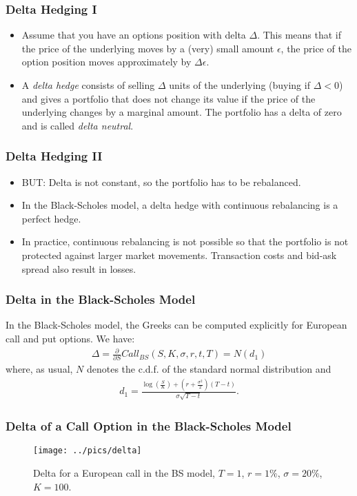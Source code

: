 \begin{frame}[fragile]
\frametitle{Delta Hedging I}
\begin{itemize}
  \item Assume that you have an options position with delta $\Delta$. This means
  that if the price of the underlying moves by a (very) small amount $\epsilon$, the
  price of the option position moves approximately by $\Delta \epsilon$.
  \item A \emph{delta hedge} consists of selling $\Delta$ units of the
  underlying (buying if $\Delta <0$) and gives a portfolio that does not
  change its value if the price of the underlying changes by a marginal amount.
  The portfolio has a delta of zero and is called \emph{delta neutral}.
\end{itemize}
\end{frame}

\begin{frame}[fragile]
\frametitle{Delta Hedging II}
\begin{itemize}
  \item BUT: Delta is not constant, so the portfolio has to be rebalanced.
  \item In the Black-Scholes model, a delta hedge with continuous rebalancing is
  a perfect hedge.
  \item In practice, continuous rebalancing is not possible so that the
  portfolio is not protected against larger market movements. Transaction
  costs and bid-ask spread also result in losses.
\end{itemize}
\end{frame}



\begin{frame}[fragile]
\frametitle{Delta in the Black-Scholes Model}
In the Black-Scholes model, the Greeks can be computed explicitly for
European call and put options. We have:
\begin{align*}
  \Delta = \frac{\partial}{\partial S}Call_{BS}(S,K,\sigma,r,t,T) = N(d_1)
\end{align*}
where, as usual, $N$ denotes the c.d.f. of the standard normal distribution and
\begin{align*}
  d_1 = \frac{\log \left( \frac{S}{K} \right) + \left( r + \frac{\sigma^2}{2}
  \right)(T-t)}{\sigma \sqrt{T-t}}.
\end{align*}
\end{frame}

\begin{frame}[fragile]
\frametitle{Delta of a Call Option in the Black-Scholes Model}
\begin{figure}[htp]
\begin{center}
  \texttt{[image: ../pics/delta]}
  \caption{Delta for a European call in the BS model, $T=1$, $r=1\%$,
  $\sigma=20\%$, $K=100$.}
  \label{fig:deltaBS}
\end{center}
\end{figure}
\end{frame}

